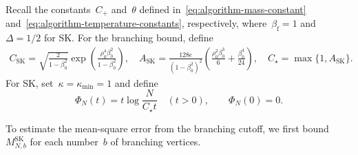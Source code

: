 \documentclass[letterpaper,11pt,reqno]{amsart}
\begin{document}
Recall the constants~$C_+$ and~$\theta$ defined in~\eqref{eq:algorithm-mass-constant} and~\eqref{eq:algorithm-temperature-constants}, respectively, where~$\beta_{\mathrm f}=1$ and~$\Delta=1/2$ for SK. For the branching bound, define
\begin{align}\label{eq:sk-mass-constants}
C_{\mathrm{SK}}=\sqrt{\frac2{1-\beta_0^2}}\exp\!\left(\frac{\rho_0^4\beta_0^2}{1-\beta_0^2}\right),\quad
A_{\mathrm{SK}}=\frac{128e}{(1-\beta_0^2)^2}
\left(\frac{\rho_0^2\beta_0^3}{6}+\frac{\beta_0^4}{24}\right),
\quad C_\star=\max\{1,A_{\mathrm{SK}}\}.
\end{align}
For SK, set~$\kappa=\kappa_{\min}=1$ and define
\begin{equation*}
\Phi_N(t)=t\log\frac{N}{C_\star t}\quad(t>0),
\qquad \Phi_N(0)=0.
\end{equation*}

To estimate the mean-square error from the branching cutoff, we first bound~$M^{\mathrm{SK}}_{N,b}$ for each number~$b$ of branching vertices.
\end{document}
